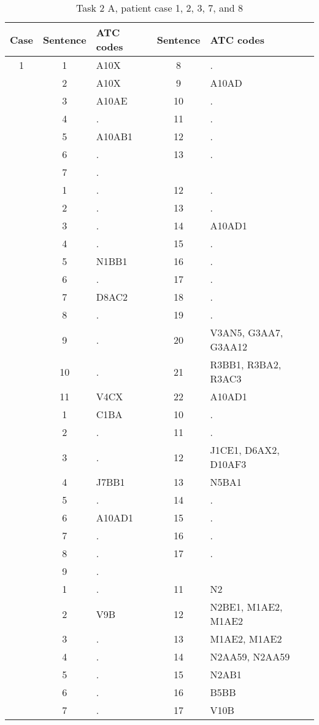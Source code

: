 \begin{table}[htbp] \footnotesize \center
\caption{Task 2 A, patient case 1, 2, 3, 7, and 8\label{tab:task2a}}
\begin{tabular}{c c l c l}
    \toprule
    Case & Sentence & ATC codes & Sentence & ATC codes \\
    \midrule
	1 & 1 & A10X & 8 & . \\
	 & 2 & A10X & 9 & A10AD \\
	 & 3 & A10AE & 10 & . \\
	 & 4 & . & 11 & . \\
	 & 5 & A10AB1 & 12 & . \\
	 & 6 & . & 13 & . \\
	 & 7 & . & & \\
	\addlinespace
	2 & 1 & . & 12 & . \\
	 & 2 & . & 13 & . \\
	 & 3 & . & 14 & A10AD1 \\
	 & 4 & . & 15 & . \\
	 & 5 & N1BB1 & 16 & . \\
	 & 6 & . & 17 & . \\
	 & 7 & D8AC2 & 18 & . \\
	 & 8 & . & 19 & . \\
	 & 9 & . & 20 & V3AN5, G3AA7, G3AA12 \\
	 & 10 & . & 21 & R3BB1, R3BA2, R3AC3 \\
	 & 11 & V4CX & 22 & A10AD1 \\
	\addlinespace
	3 & 1 & C1BA & 10 & . \\
	 & 2 & . & 11 & . \\
	 & 3 & . & 12 & J1CE1, D6AX2, D10AF3 \\
	 & 4 & J7BB1 & 13 & N5BA1 \\
	 & 5 & . & 14 & . \\
	 & 6 & A10AD1 & 15 & . \\
	 & 7 & . & 16 & . \\
	 & 8 & . & 17 & . \\
	 & 9 & . & & \\
	\addlinespace
	7 & 1 & . & 11 & N2 \\
	 & 2 & V9B & 12 & N2BE1, M1AE2, M1AE2 \\
	 & 3 & . & 13 & M1AE2, M1AE2 \\
	 & 4 & . & 14 & N2AA59, N2AA59 \\
	 & 5 & . & 15 & N2AB1 \\
	 & 6 & . & 16 & B5BB \\
	 & 7 & . & 17 & V10B \\

\end{tabular}
\end{table}
